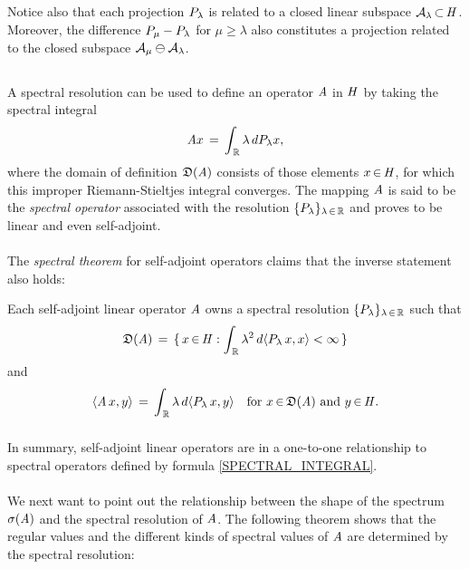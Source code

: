 \documentclass[11pt,twoside]{article}
\begin{document}
\subparagraph{}
Notice also that each projection ${P}_{\lambda}$ is related
to a closed linear subspace $\mathcal{A}_{\lambda} {\,\subset\,} \mathit{H}$.
Moreover,
the difference ${P}_{\mu} - {P}_{\lambda}$
for $\mu \geq \lambda$ also constitutes a projection 
related to the closed subspace $\mathcal{A}_{\mu} \ominus \mathcal{A}_{\lambda}$.

\subsection{} %
A spectral resolution can be used to define an operator $\mathit{A}$ in $\mathit{H}$
by taking the spectral integral
\begin{equation}\label{SPECTRAL_INTEGRAL}
\mathit{A} x \,=\, \int_{\,{\mathbb{R}}} \lambda \, d{P}_{\lambda}x,
\end{equation}
where the domain of definition $\mathfrak{D}(\mathit{A})$
consists of those elements $x {\,\in\,} \mathit{H}$,
for which this improper Riemann-Stieltjes integral converges.
The mapping $\mathit{A}$ is said to be the \textit{spectral operator}
associated with the resolution $\{{P}_{\lambda}\}_{\lambda {\,\in\,} {\mathbb{R}}}$
and proves to be linear and even self-adjoint.

\paragraph{} %
The \textit{spectral theorem} for self-adjoint operators claims
that the inverse statement also holds:

\begin{theorem}\label{SPECTRAL_THEOREM}
Each self-adjoint linear operator $\mathit{A}$
owns a spectral resolution $\{{P}_{\lambda}\}_{\lambda {\,\in\,} {\mathbb{R}}}$
such that
\[
\mathfrak{D}(\mathit{A}) \,=\,
\{\, x {\,\in\,} \mathit{H}:
    \int_{\,{\mathbb{R}}}
\lambda^2 \, d \langle {P}_{\lambda} \,x,x \rangle < \infty\,\}
\]
and
\[
\langle \mathit{A} \, x,y \rangle \,=\,
\int_{\,{\mathbb{R}}} \lambda \, d\langle {P}_{\lambda} \,x,y \rangle
\quad \mbox{for } x {\,\in\,} \mathfrak{D}(\mathit{A}) \mbox{ and } y {\,\in\,} \mathit{H}.
\]
\end{theorem}

\subparagraph{}
In summary,
self-adjoint linear operators are in a one-to-one relationship
to spectral operators defined by formula \eqref{SPECTRAL_INTEGRAL}.

\paragraph*{} %
We next want to point out the relationship between
the shape of the spectrum $\sigma(\mathit{A})$ and the spectral resolution of $\mathit{A}$.
The following theorem shows
that the regular values and the different kinds of spectral values of $\mathit{A}$
are determined by the spectral resolution:
\end{document}
